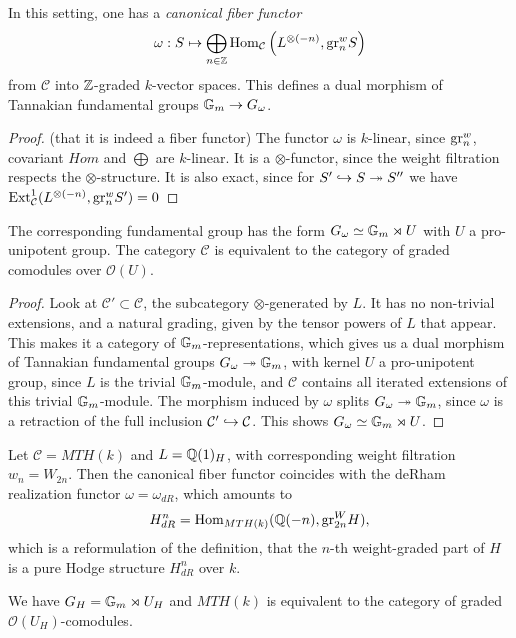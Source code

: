 \begin{defn}
 In this setting, one has a \emph{canonical fiber functor}
\[\omega : S \mapsto \bigoplus_{n \in \mathbb{Z}} \mathrm{Hom}_{\mathcal{C}}\left( L^{\otimes (-n)}, \mathrm{gr}_n^w S \right)\]
from $\mathcal{C}$ into $\mathbb{Z}$-graded $k$-vector spaces.
This defines a dual morphism of Tannakian fundamental groups $\mathbb{G}_m \to G_\omega$.
\end{defn}
\begin{proof} (that it is indeed a fiber functor)
The functor $\omega$ is $k$-linear, since $\mathrm{gr}_n^w$, covariant $Hom$ and $\bigoplus$ are $k$-linear.
It is a $\otimes$-functor, since the weight filtration respects the $\otimes$-structure.
It is also exact, since for $S' \hookrightarrow S \twoheadrightarrow S''$ we have $\mathrm{Ext}^1_{\mathcal{C}}(L^{\otimes (-n)},\mathrm{gr}_n^w S') = 0$
\end{proof}


\begin{lemma}
 The corresponding fundamental group has the form $G_\omega \simeq \mathbb{G}_m \rtimes U$ with $U$ a pro-unipotent group.
The category $\mathcal{C}$ is equivalent to the category of graded comodules over $\mathcal{O}(U)$.
\end{lemma}
\begin{proof}
Look at $\mathcal{C}' \subset \mathcal{C}$, the subcategory $\otimes$-generated by $L$. It has no non-trivial extensions,
and a natural grading, given by the tensor powers of $L$ that appear. This makes it a category of $\mathbb{G}_m$-representations,
which gives us a dual morphism of Tannakian fundamental groups $G_\omega \twoheadrightarrow \mathbb{G}_m$,
with kernel $U$ a pro-unipotent group, since $L$ is the trivial $\mathbb{G}_m$-module, and $\mathcal{C}$ contains all iterated extensions of this trivial $\mathbb{G}_m$-module. The morphism induced by $\omega$ splits $G_\omega \twoheadrightarrow \mathbb{G}_m$, since $\omega$ is a retraction of the full inclusion $\mathcal{C}' \hookrightarrow \mathcal{C}$. This shows $G_\omega \simeq \mathbb{G}_m \rtimes U$.
\end{proof}

\begin{exam}
 Let $\mathcal{C} = MTH(k)$ and $L=\mathbb{Q}(1)_H$, with corresponding weight filtration $w_n = W_{2n}$. Then the canonical fiber functor coincides with the deRham realization functor $\omega = \omega_{dR}$, which amounts to
\[H_{dR}^n = \mathrm{Hom}_{MTH(k)}(\mathbb{Q}(-n),\mathrm{gr}^W_{2n} H),\]
which is a reformulation of the definition, that the $n$-th weight-graded part of $H$ is a pure Hodge structure $H_{dR}^n$ over $k$.

We have $G_{H} = \mathbb{G}_m \rtimes U_{H}$ and $MTH(k)$ is equivalent to the category of graded $\mathcal{O}(U_H)$-comodules.
\end{exam}

